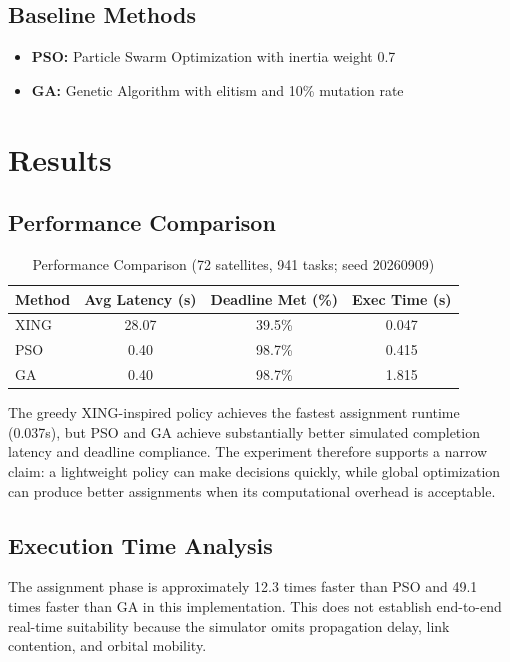 \documentclass[sigconf]{acmart}
\begin{document}
\subsection{Baseline Methods}

\begin{itemize}
\item \textbf{PSO:} Particle Swarm Optimization with inertia weight 0.7
\item \textbf{GA:} Genetic Algorithm with elitism and 10\% mutation rate
\end{itemize}

\section{Results}

\subsection{Performance Comparison}

\begin{table}[h]
\centering
\caption{Performance Comparison (72 satellites, 941 tasks; seed 20260909)}
\begin{tabular}{lccc}
\toprule
Method & Avg Latency (s) & Deadline Met (\%) & Exec Time (s) \\
\midrule
XING & 28.07 & 39.5\% & 0.047 \\
PSO & 0.40 & 98.7\% & 0.415 \\
GA & 0.40 & 98.7\% & 1.815 \\
\bottomrule
\end{tabular}
\end{table}

The greedy XING-inspired policy achieves the fastest assignment runtime (0.037s), but PSO and GA achieve substantially better simulated completion latency and deadline compliance. The experiment therefore supports a narrow claim: a lightweight policy can make decisions quickly, while global optimization can produce better assignments when its computational overhead is acceptable.

\subsection{Execution Time Analysis}

The assignment phase is approximately 12.3 times faster than PSO and 49.1 times faster than GA in this implementation. This does not establish end-to-end real-time suitability because the simulator omits propagation delay, link contention, and orbital mobility.
\end{document}
